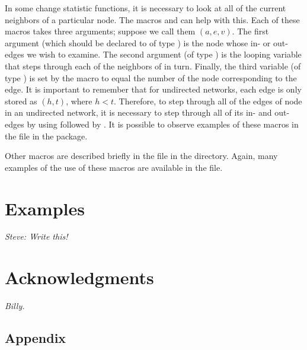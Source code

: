 \documentclass[article]{jss}
\begin{document}
In some change statistic functions, it is necessary to look at all of the current
neighbors of a particular node.  The macros
 and 
can help with this.  Each of these macros takes three arguments; suppose
we call them $(a, e, v)$.  The first argument (which should be declared to of type ) is the node whose in- or out-edges
we wish to examine.  The second argument (of type ) is the looping
variable that steps through each of the neighbors of  in turn.  Finally,
the third variable (of type ) is set by the macro to equal the number of
the node corresponding to the edge.  It is important to remember that for undirected
networks, each edge is only stored as $(h,t)$, where $h<t$.  Therefore, to step
through all of the edges of node  in an undirected network, it is necessary
to step through all of its in- and out-edges by using
followed by 
.  It is possible to observe
examples of these macros in the  file in the
 package.

Other macros are described briefly in the file  in the 
directory.  Again, many examples of the use of these macros are available in the
 file.


\section{Examples}
\label{Examples}

{\em Steve: Write this!}

\section*{Acknowledgments}

{\em Billy.}



\newpage

\begin{appendix}


\section[appendix]{Appendix}
\label{appendix}

\end{appendix}
\end{document}
